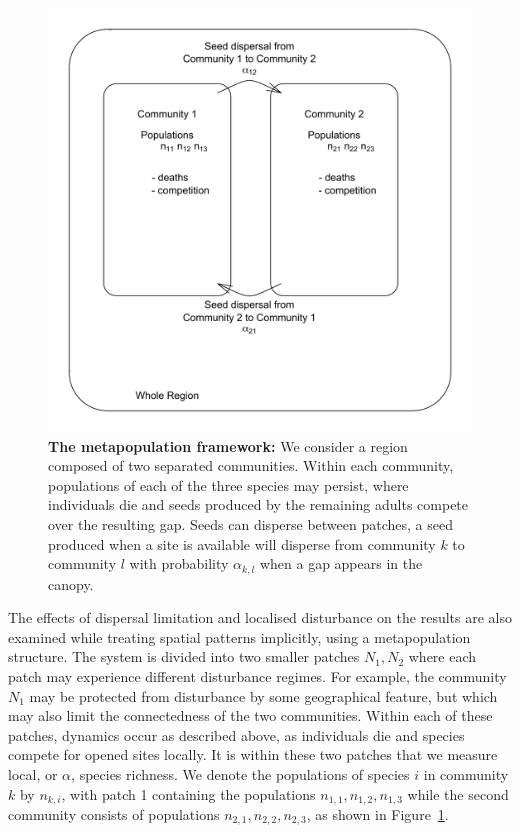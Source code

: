 \begin{figure}[htbp]
\begin{center}
\includegraphics[width=4.5in]{schematic.pdf}
\caption[The metapopulation framework]{\textbf{The metapopulation framework:} We consider a region composed of two separated communities. Within each community, populations of each of the three species may persist, where individuals die and seeds produced by the remaining adults compete over the resulting gap. Seeds can disperse between patches, a seed produced when a site is available will disperse from community $k$ to community $l$ with probability $\alpha_{k,l}$ when a gap appears in the canopy.}
\label{fig:schematic}
\end{center}
\end{figure}

The effects of dispersal limitation and localised disturbance on the results are also examined while treating spatial patterns implicitly, using a metapopulation structure. The system is divided into two smaller patches $N_1,N_2$ where each patch may experience different disturbance regimes. For example, the community $N_1$ may be protected from disturbance by some geographical feature, but which may also limit the connectedness of the two communities. Within each of these patches, dynamics occur as described above, as individuals die and species compete for opened sites locally. It is within these two patches that we measure local, or $\alpha$, species richness. We denote the populations of species $i$ in community $k$ by $n_{k,i}$, with patch 1 containing the populations $n_{1,1}, n_{1,2}, n_{1,3}$ while the second community consists of populations $n_{2,1}, n_{2,2}, n_{2,3}$, as shown in Figure~\ref{fig:schematic}.

